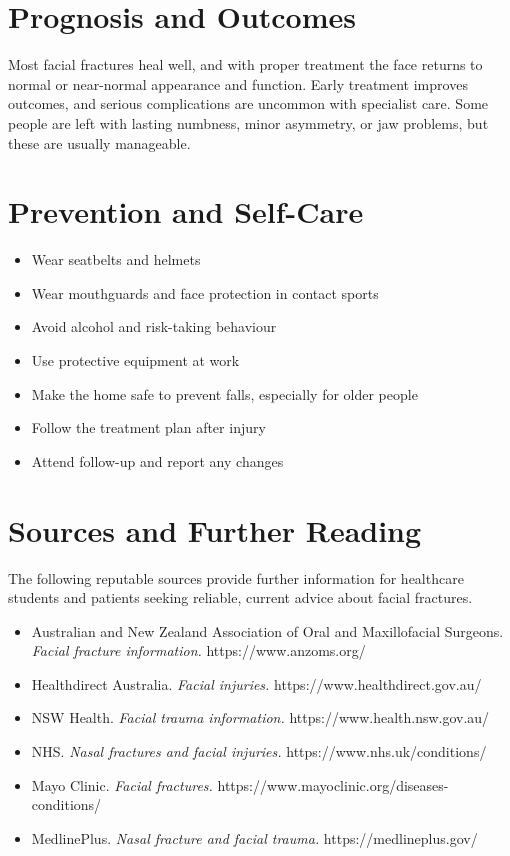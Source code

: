 \section*{Prognosis and Outcomes}
Most facial fractures heal well, and with proper treatment the face returns to normal or near-normal appearance and function. Early treatment improves outcomes, and serious complications are uncommon with specialist care. Some people are left with lasting numbness, minor asymmetry, or jaw problems, but these are usually manageable.

\section*{Prevention and Self-Care}
\begin{itemize}
    \item Wear seatbelts and helmets
    \item Wear mouthguards and face protection in contact sports
    \item Avoid alcohol and risk-taking behaviour
    \item Use protective equipment at work
    \item Make the home safe to prevent falls, especially for older people
    \item Follow the treatment plan after injury
    \item Attend follow-up and report any changes
\end{itemize}

\section*{Sources and Further Reading}
The following reputable sources provide further information for healthcare students and patients seeking reliable, current advice about facial fractures.
\begin{itemize}
    \item Australian and New Zealand Association of Oral and Maxillofacial Surgeons. \textit{Facial fracture information.} https://www.anzoms.org/
    \item Healthdirect Australia. \textit{Facial injuries.} https://www.healthdirect.gov.au/
    \item NSW Health. \textit{Facial trauma information.} https://www.health.nsw.gov.au/
    \item NHS. \textit{Nasal fractures and facial injuries.} https://www.nhs.uk/conditions/
    \item Mayo Clinic. \textit{Facial fractures.} https://www.mayoclinic.org/diseases-conditions/
    \item MedlinePlus. \textit{Nasal fracture and facial trauma.} https://medlineplus.gov/
\end{itemize}

